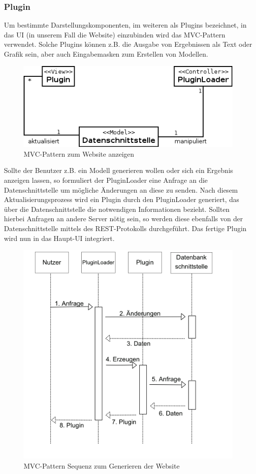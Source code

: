 \subsubsection{Plugin}
Um bestimmte Darstellungskomponenten, im weiteren als Plugins bezeichnet, in das UI (in unserem Fall die Website) einzubinden wird das MVC-Pattern verwendet. Solche Plugins können z.B. die Ausgabe von Ergebnissen als Text oder Grafik sein, aber auch Eingabemasken zum Erstellen von Modellen.

\begin{figure}[h]
\centering
\includegraphics[width=0.6\linewidth]{Grafik/Diagramm/Pattern/MVC/Kontextdiagramm.png}
\caption[MVC Website Klassen]{MVC-Pattern zum Website anzeigen}
\end{figure}

\noindent Sollte der Benutzer z.B. ein Modell generieren wollen oder sich ein Ergebnis anzeigen lassen, so formuliert der PluginLoader eine Anfrage an die Datenschnittstelle um mögliche Änderungen an diese zu senden. Nach diesem Aktualisierungsprozess wird ein Plugin durch den PluginLoader generiert, das über die Datenschnittstelle die notwendigen Informationen bezieht. Sollten hierbei Anfragen an andere Server nötig sein, so werden diese ebenfalls von der Datenschnittstelle mittels des REST-Protokolls durchgeführt. 
Das fertige Plugin wird nun in das Haupt-UI integriert.

\begin{figure}[h]
\centering
\includegraphics[width=0.6\linewidth]{Grafik/Diagramm/Pattern/MVC/Sequenzdiagramm.png}
\caption[MVC Website Sequenz]{MVC-Pattern Sequenz zum Generieren der Website}
\end{figure}

